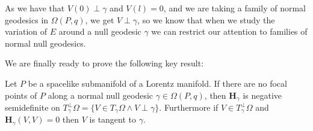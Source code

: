 As we have that \(V(0) \perp \gamma\) and \(V(l) = 0\), and we are taking a family of normal geodesics in \(\Omega(P, q)\), we get \(V \perp \gamma\), so we know that when we study the variation of \(E\) around a null geodesic \(\gamma\) we can restrict our attention to families of normal null geodesics.

We are finally ready to prove the following key result:
\begin{prop}
	\label{prop:H-positivity-criteria}
	Let \(P\) be a spacelike submanifold of a Lorentz manifold. If there are no focal points of \(P\) along a normal null geodesic \(\gamma\in\Omega(P,q)\), then \(\textbf{H}_\gamma\) is negative semidefinite on 
	\(T_{\gamma}^{\perp}\Omega = \{V \in T_{\gamma}\Omega \wedge V \perp \gamma\}\). Furthermore if \(V \in T_{\gamma}^{\perp}\Omega \) and \(\textbf{H}_\gamma(V, V) = 0\) then \(V\) is tangent to \(\gamma\).
\end{prop}


